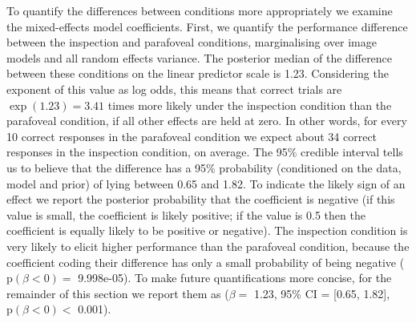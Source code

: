 \documentclass[article, 11pt,a4paper,natbib]{apa6}\usepackage[]{graphicx}\usepackage[]{color}
\begin{document}
To quantify the differences between conditions more appropriately we examine the mixed-effects model coefficients. 
First, we quantify the performance difference between the inspection and parafoveal conditions, marginalising over image models and all random effects variance.
The posterior median of the difference between these conditions on the linear predictor scale is 1.23. %
Considering the exponent of this value as log odds, this means that correct trials are $\exp(1.23) = 3.41$ times more likely under the inspection condition than the parafoveal condition, if all other effects are held at zero.
In other words, for every 10 correct responses in the parafoveal condition we expect about 34 correct responses in the inspection condition, on average.
The 95\% credible interval tells us to believe that the difference has a 95\% probability (conditioned on the data, model and prior) of lying between 
0.65 and
1.82.
To indicate the likely sign of an effect we report the posterior probability that the coefficient is negative (if this value is small, the coefficient is likely positive; if the value is 0.5 then the coefficient is equally likely to be positive or negative).
The inspection condition is very likely to elicit higher performance than the parafoveal condition, because the coefficient coding their difference has only a small probability of being negative ($\mathrm{p}(\beta < 0) = $ 
9.998e-05).
To make future quantifications more concise, for the remainder of this section we report them as 
($\beta = $ 1.23, 95\% CI = [0.65, 1.82], $\mathrm{p}(\beta < 0) < $ 0.001).
\end{document}
